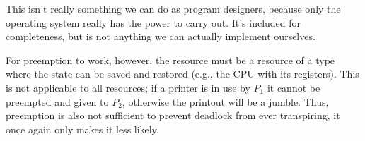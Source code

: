 This isn't really something we can do as program designers, because only the operating system really has the power to carry out. It's included for completeness, but is not anything we can actually implement ourselves.

For preemption to work, however, the resource must be a resource of a type where the state can be saved and restored (e.g., the CPU with its registers). This is not applicable to all resources; if a printer is in use by $P_{1}$ it cannot be preempted and given to $P_{2}$, otherwise the printout will be a jumble. Thus, preemption is also not sufficient to prevent deadlock from ever transpiring, it once again only makes it less likely.




